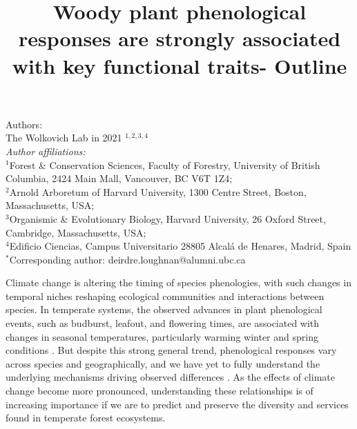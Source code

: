 \documentclass{article}\usepackage[]{graphicx}\usepackage[]{color}
\title{Woody plant phenological responses are strongly associated with key functional traits- Outline}
\begin{document}
\maketitle

\noindent Authors:\\
The Wolkovich Lab in 2021 $^{1,2,3,4}$
\vspace{2ex}\\
\emph{Author affiliations:}\\
$^{1}$Forest \& Conservation Sciences, Faculty of Forestry, University of British Columbia, 2424 Main Mall, Vancouver, BC V6T 1Z4;\\
$^{2}$Arnold Arboretum of Harvard University, 1300 Centre Street, Boston, Massachusetts, USA;\\
$^{3}$Organismic \& Evolutionary Biology, Harvard University, 26 Oxford Street, Cambridge, Massachusetts, USA;\\
$^{4}$Edificio Ciencias, Campus Universitario 28805 Alcalá de Henares, Madrid, Spain\\
 

\vspace{2ex}
$^*$Corresponding author: deirdre.loughnan@alumni.ubc.ca\\
\renewcommand{\thetable}{\arabic{table}}
\renewcommand{\thefigure}{\arabic{figure}}
\renewcommand{\labelitemi}{$-$}

Climate change is altering the timing of species phenologies, with such changes in temporal niches reshaping ecological communities and interactions between species. In temperate systems, the observed advances in plant phenological events, such as budburst, leafout, and flowering times, are associated with changes in seasonal temperatures, particularly warming winter and spring conditions \citep{Menzel2006,Fitter2002}. But despite this strong general trend, phenological responses vary across species and geographically, and we have yet to fully understand the underlying mechanisms driving observed differences \citep{Chuine2010,Morin2009}. As the effects of climate change become more pronounced, understanding these relationships is of increasing importance if we are to predict and preserve the diversity and services found in temperate forest ecosystems. %
\end{document}
